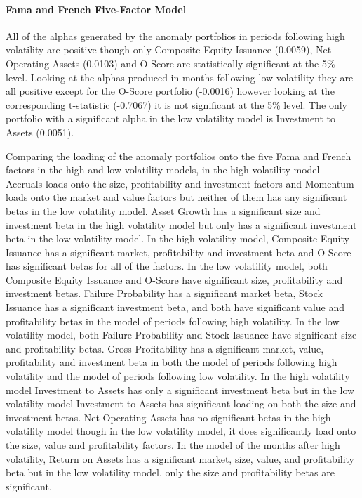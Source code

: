 \documentclass[a4paper]{article}                 %
\begin{document}
\paragraph{Fama and French Five-Factor Model}
All of the alphas generated by the anomaly portfolios in periods following high volatility are positive though only Composite Equity Issuance (0.0059), Net Operating Assets (0.0103) and O-Score are statistically significant at the 5\% level. Looking at the alphas produced in months following low volatility they are all positive except for the O-Score portfolio (-0.0016) however looking at the corresponding t-statistic (-0.7067) it is not significant at the 5\% level. The only portfolio with a significant alpha in the low volatility model is Investment to Assets (0.0051).

Comparing the loading of the anomaly portfolios onto the five Fama and French factors in the high and low volatility models, in the high volatility model Accruals loads onto the size, profitability and investment factors and Momentum loads onto the market and value factors but neither of them has any significant betas in the low volatility model. Asset Growth has a significant size and investment beta in the high volatility model but only has a significant investment beta in the low volatility model. In the high volatility model, Composite Equity Issuance has a significant market, profitability and investment beta and O-Score has significant betas for all of the factors. In the low volatility model, both Composite Equity Issuance and O-Score have significant size, profitability and investment betas. Failure Probability has a significant market beta, Stock Issuance has a significant investment beta, and both have significant value and profitability betas in the model of periods following high volatility. In the low volatility model, both Failure Probability and Stock Issuance have significant size and profitability betas. Gross Profitability has a significant market, value, profitability and investment beta in both the model of periods following high volatility and the model of periods following low volatility. In the high volatility model Investment to Assets has only a significant investment beta but in the low volatility model Investment to Assets has significant loading on both the size and investment betas. Net Operating Assets has no significant betas in the high volatility model though in the low volatility model, it does significantly load onto the size, value and profitability factors. In the model of the months after high volatility, Return on Assets has a significant market, size, value, and profitability beta but in the low volatility model, only the size and profitability betas are significant. 
\end{document}
